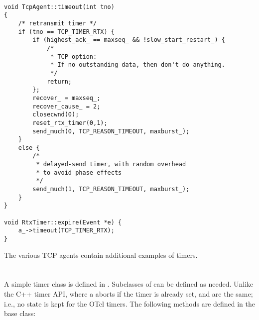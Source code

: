 \begin{small}
\begin{verbatim}

void TcpAgent::timeout(int tno)
{                     
    /* retransmit timer */
    if (tno == TCP_TIMER_RTX) {
        if (highest_ack_ == maxseq_ && !slow_start_restart_) {
            /*
             * TCP option:
             * If no outstanding data, then don't do anything.
             */
            return;  
        };
        recover_ = maxseq_;
        recover_cause_ = 2;
        closecwnd(0);
        reset_rtx_timer(0,1);
        send_much(0, TCP_REASON_TIMEOUT, maxburst_); 
    }       
    else {  
        /*  
         * delayed-send timer, with random overhead
         * to avoid phase effects  
         */     
        send_much(1, TCP_REASON_TIMEOUT, maxburst_);
    }           
}           
            
void RtxTimer::expire(Event *e) {
    a_->timeout(TCP_TIMER_RTX);
}

\end{verbatim}
\end{small}

The various TCP agents contain additional examples of timers.

\section{}

A simple timer class is defined in .  Subclasses of
 can be defined as needed.  Unlike the C++ timer API, where a 
 aborts if the timer is already set,  and
 are the same; i.e., no state is kept for the OTcl timers.
The following methods are defined in the  base class:

\endinput
